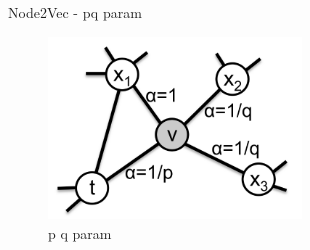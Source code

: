 \begin{frame}{Node2Vec - pq param}
    \begin{figure}[htp]
        \centering
        \includegraphics[width=0.6\textwidth]{topics/201010-zhang2019comprehensive/assets/img/p-q-param.png}
        \caption{p q param \cite{grover2016node2vec}}
    \end{figure}
\end{frame}